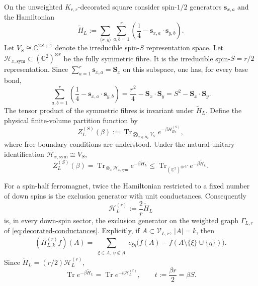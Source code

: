 \documentclass[11pt]{article}
\numberwithin{equation}{section}
\theoremstyle{remark}
\newcommand{\Tr}{\operatorname{Tr}}
\newcommand{\1}{\mathbf 1}
\newcommand{\Sp}{\mathbf S}
\begin{document}
On the unweighted \(K_{r,r}\)-decorated square consider spin-\(1/2\)
generators \(\mathbf s_{x,a}\) and the Hamiltonian
\begin{equation}
 \widetilde H_L
 :=\sum_{\langle x,y\rangle}\sum_{a,b=1}^r
 \left(\frac14-\mathbf s_{x,a}\mathbin\cdot\mathbf s_{y,b}\right).
 \label{eq:decorated-hamiltonian}
\end{equation}
Let \(V_S\cong\mathbb C^{2S+1}\) denote the irreducible spin-\(S\)
representation space.
Let \(\mathcal H_{x,\mathrm{sym}}\subset(\mathbb C^2)^{\otimes r}\) be the
fully symmetric fibre.  It is the irreducible spin-\(S=r/2\)
representation.  Since
\(\sum_{a=1}^r\mathbf s_{x,a}=\Sp_x\) on this subspace, one has,
for every base bond,
\begin{equation}
 \sum_{a,b=1}^r
 \left(\frac14-\mathbf s_{x,a}\mathbin\cdot\mathbf s_{y,b}\right)
 =\frac{r^2}{4}-\Sp_x\mathbin\cdot\Sp_y
 =S^2-\Sp_x\mathbin\cdot\Sp_y.
 \label{eq:fibre-bond-identity}
\end{equation}
The tensor product of the symmetric fibres is invariant under
\(\widetilde H_L\).  Define the physical finite-volume partition function
by
\[
 Z_L^{(S)}(\beta):=
 \Tr_{\bigotimes_{x\in B_L}V_S}e^{-\beta H_{B_L}^{(S)}},
\]
where free boundary conditions are understood.  Under the natural unitary
identification \(\mathcal H_{x,\mathrm{sym}}\cong V_S\),
\begin{equation}
 Z_L^{(S)}(\beta)
 =\Tr_{\otimes_x\mathcal H_{x,\mathrm{sym}}}
 e^{-\beta\widetilde H_L}
 \leq \Tr_{(\mathbb C^2)^{\otimes rV}}e^{-\beta\widetilde H_L}.
 \label{eq:physical-decorated-trace}
\end{equation}

For a spin-half ferromagnet, twice the Hamiltonian restricted to a fixed
number of down spins is the exclusion generator with unit conductances.
Consequently
\begin{equation}
 \mathcal H_L^{(r)}:=\frac2r\widetilde H_L
 \label{eq:normalized-decorated-hamiltonian}
\end{equation}
is, in every down-spin sector, the exclusion generator on the weighted
graph \(\Gamma_{L,r}\) of \eqref{eq:decorated-conductances}.  Explicitly,
if \(A\subset\mathcal V_{L,r}\), \(|A|=k\), then
\begin{equation}
 (H_{L,k}^{(r)}f)(A)
 =\sum_{\substack{\xi\in A,\ \eta\notin A}}
 c_{\xi\eta}\bigl(f(A)-f(A\setminus\{\xi\}\cup\{\eta\})\bigr).
 \label{eq:decorated-exclusion-generator}
\end{equation}
Since \(\widetilde H_L=(r/2)\mathcal H_L^{(r)}\),
\begin{equation}
 \Tr e^{-\beta\widetilde H_L}
 =\Tr e^{-t\mathcal H_L^{(r)}},
 \qquad t:=\frac{\beta r}{2}=\beta S.
 \label{eq:decorated-time-normalization}
\end{equation}
\end{document}
